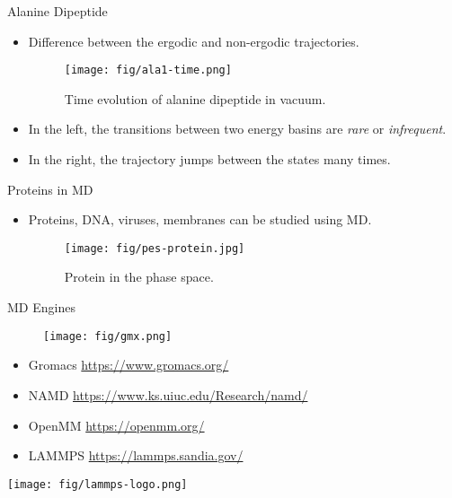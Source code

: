 \documentclass[10pt]{beamer}
\begin{document}
\begin{frame}{Alanine Dipeptide}
\begin{itemize}
\setlength\itemsep{1em}
  \item Difference between the ergodic and non-ergodic trajectories.
  \begin{figure}
    \texttt{[image: fig/ala1-time.png]}
    \caption{Time evolution of alanine dipeptide in vacuum.}
  \end{figure}

  \item In the left, the transitions between two energy basins are \textit{rare} or \textit{infrequent}.

  \item In the right, the trajectory jumps between the states many times.
\end{itemize}
\end{frame}

\begin{frame}{Proteins in MD}
\begin{itemize}
\setlength\itemsep{1em}
  \item Proteins, DNA, viruses, membranes can be studied using MD.
  \begin{figure}
    \texttt{[image: fig/pes-protein.jpg]}
    \caption{Protein in the phase space.}
  \end{figure}
\end{itemize}
\end{frame}

\begin{frame}{MD Engines}
  \begin{figure}
    \texttt{[image: fig/gmx.png]}
  \end{figure}
\begin{itemize}
\setlength\itemsep{1em}
  \item Gromacs \url{https://www.gromacs.org/}
  \item NAMD \url{https://www.ks.uiuc.edu/Research/namd/}
  \item OpenMM \url{https://openmm.org/}
  \item LAMMPS \url{https://lammps.sandia.gov/}
\end{itemize}
\end{frame}

\begin{frame}{}
  \begin{center}
    \vspace{1.2cm}
    \texttt{[image: fig/lammps-logo.png]}
  \end{center}
\end{frame}
\end{document}
